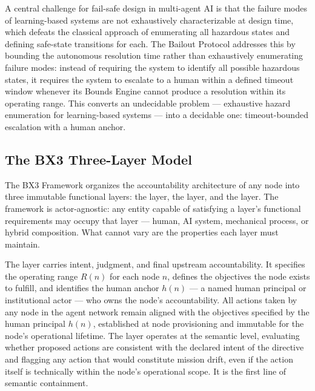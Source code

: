 A central challenge for fail-safe design in multi-agent AI is that the failure modes of learning-based systems are not exhaustively characterizable at design time, which defeats the classical approach of enumerating all hazardous states and defining safe-state transitions for each. The Bailout Protocol addresses this by bounding the autonomous resolution time rather than exhaustively enumerating failure modes: instead of requiring the system to identify all possible hazardous states, it requires the system to escalate to a human within a defined timeout window whenever its Bounds Engine cannot produce a resolution within its operating range. This converts an undecidable problem --- exhaustive hazard enumeration for learning-based systems --- into a decidable one: timeout-bounded escalation with a human anchor.

\subsection{The BX3 Three-Layer Model}
\label{sec:bx3model}

The BX3 Framework organizes the accountability architecture of any node into three immutable functional layers: the \purpose{} layer, the \bounds{} layer, and the \fact{} layer. The framework is actor-agnostic: any entity capable of satisfying a layer's functional requirements may occupy that layer --- human, AI system, mechanical process, or hybrid composition. What cannot vary are the properties each layer must maintain.

The \purpose{} layer carries intent, judgment, and final upstream accountability. It specifies the operating range $R(n)$ for each node $n$, defines the objectives the node exists to fulfill, and identifies the human anchor $h(n)$ --- a named human principal or institutional actor --- who owns the node's accountability. All actions taken by any node in the agent network remain aligned with the objectives specified by the human principal $h(n)$, established at node provisioning and immutable for the node's operational lifetime. The \purpose{} layer operates at the semantic level, evaluating whether proposed actions are consistent with the declared intent of the directive and flagging any action that would constitute mission drift, even if the action itself is technically within the node's operational scope. It is the first line of semantic containment.

